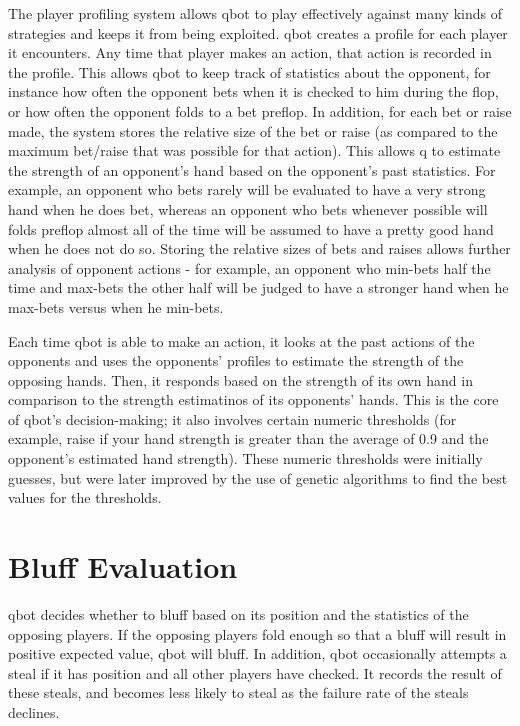 \documentclass[]{article}
\begin{document}
The player profiling system allows qbot to play effectively against many kinds of strategies and keeps it from being exploited. qbot creates a profile for each player it encounters. Any time that player makes an action, that action is recorded in the profile. This allows qbot to keep track of statistics about the opponent, for instance how often the opponent bets when it is checked to him during the flop, or how often the opponent folds to a bet preflop. In addition, for each bet or raise made, the system stores the relative size of the bet or raise (as compared to the maximum bet/raise that was possible for that action). This allows q to estimate the strength of an opponent's hand based on the opponent's past statistics. For example, an opponent who bets rarely will be evaluated to have a very strong hand when he does bet, whereas an opponent who bets whenever possible will folds preflop almost all of the time will be assumed to have a pretty good hand when he does not do so. Storing the relative sizes of bets and raises allows further analysis of opponent actions - for example, an opponent who min-bets half the time and max-bets the other half will be judged to have a stronger hand when he max-bets versus when he min-bets.

Each time qbot is able to make an action, it looks at the past actions of the opponents and uses the opponents' profiles to estimate the strength of the opposing hands. Then, it responds based on the strength of its own hand in comparison to the strength estimatinos of its opponents' hands. This is the core of qbot's decision-making; it also involves certain numeric thresholds (for example, raise if your hand strength is greater than the average of 0.9 and the opponent's estimated hand strength). These numeric thresholds were initially guesses, but were later improved by the use of genetic algorithms to find the best values for the thresholds.

\section{Bluff Evaluation}

qbot decides whether to bluff based on its position and the statistics of the opposing players. If the opposing players fold enough so that a bluff will result in positive expected value, qbot will bluff. In addition, qbot occasionally attempts a steal if it has position and all other players have checked. It records the result of these steals, and becomes less likely to steal as the failure rate of the steals declines.
\end{document}

